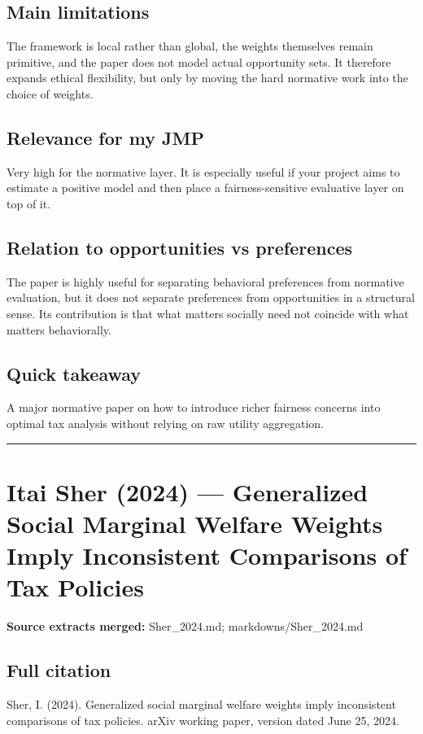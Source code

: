 \documentclass[11pt,a4paper]{article}
\begin{document}
\subsection*{Main limitations}
The framework is local rather than global, the weights themselves remain primitive, and the paper does not model actual opportunity sets. It therefore expands ethical flexibility, but only by moving the hard normative work into the choice of weights.

\subsection*{Relevance for my JMP}
Very high for the normative layer. It is especially useful if your project aims to estimate a positive model and then place a fairness-sensitive evaluative layer on top of it.

\subsection*{Relation to opportunities vs preferences}
The paper is highly useful for separating behavioral preferences from normative evaluation, but it does not separate preferences from opportunities in a structural sense. Its contribution is that what matters socially need not coincide with what matters behaviorally.

\subsection*{Quick takeaway}
A major normative paper on how to introduce richer fairness concerns into optimal tax analysis without relying on raw utility aggregation.


\medskip\hrule\medskip

\section*{Itai Sher (2024) — Generalized Social Marginal Welfare Weights Imply Inconsistent Comparisons of Tax Policies}

\textbf{Source extracts merged:} Sher\_2024.md; markdowns/Sher\_2024.md

\subsection*{Full citation}
Sher, I. (2024). Generalized social marginal welfare weights imply inconsistent comparisons of tax policies. arXiv working paper, version dated June 25, 2024.
\end{document}
